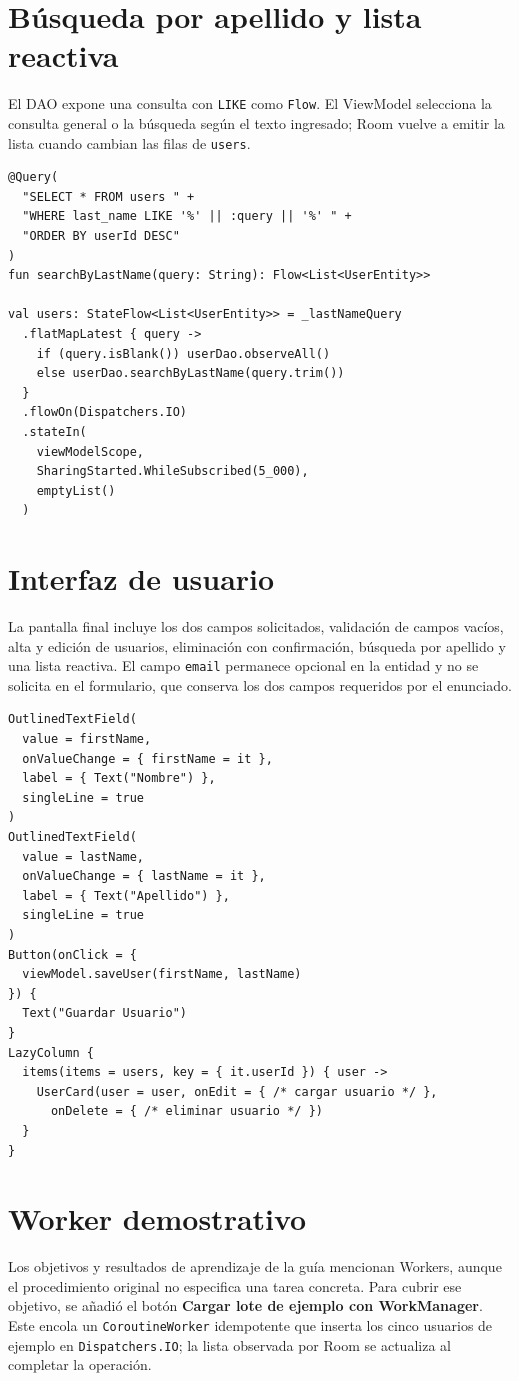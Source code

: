\documentclass[12pt,a4paper,oneside]{report}
\begin{document}
\section{Búsqueda por apellido y lista reactiva}
El DAO expone una consulta con \texttt{LIKE} como \texttt{Flow}. El ViewModel
selecciona la consulta general o la búsqueda según el texto ingresado; Room vuelve
a emitir la lista cuando cambian las filas de \texttt{users}.

\begin{lstlisting}
@Query(
  "SELECT * FROM users " +
  "WHERE last_name LIKE '%' || :query || '%' " +
  "ORDER BY userId DESC"
)
fun searchByLastName(query: String): Flow<List<UserEntity>>

val users: StateFlow<List<UserEntity>> = _lastNameQuery
  .flatMapLatest { query ->
    if (query.isBlank()) userDao.observeAll()
    else userDao.searchByLastName(query.trim())
  }
  .flowOn(Dispatchers.IO)
  .stateIn(
    viewModelScope,
    SharingStarted.WhileSubscribed(5_000),
    emptyList()
  )
\end{lstlisting}

\section{Interfaz de usuario}
La pantalla final incluye los dos campos solicitados, validación de campos vacíos,
alta y edición de usuarios, eliminación con confirmación, búsqueda por apellido y
una lista reactiva. El campo \texttt{email} permanece opcional en la entidad y no se
solicita en el formulario, que conserva los dos campos requeridos por el enunciado.

\begin{lstlisting}
OutlinedTextField(
  value = firstName,
  onValueChange = { firstName = it },
  label = { Text("Nombre") },
  singleLine = true
)
OutlinedTextField(
  value = lastName,
  onValueChange = { lastName = it },
  label = { Text("Apellido") },
  singleLine = true
)
Button(onClick = {
  viewModel.saveUser(firstName, lastName)
}) {
  Text("Guardar Usuario")
}
LazyColumn {
  items(items = users, key = { it.userId }) { user ->
    UserCard(user = user, onEdit = { /* cargar usuario */ },
      onDelete = { /* eliminar usuario */ })
  }
}
\end{lstlisting}

\section{Worker demostrativo}
Los objetivos y resultados de aprendizaje de la guía mencionan Workers, aunque el
procedimiento original no especifica una tarea concreta. Para cubrir ese objetivo,
se añadió el botón \textbf{Cargar lote de ejemplo con WorkManager}. Este encola un
\texttt{CoroutineWorker} idempotente que inserta los cinco usuarios de ejemplo en
\texttt{Dispatchers.IO}; la lista observada por Room se actualiza al completar la
operación.
\end{document}
